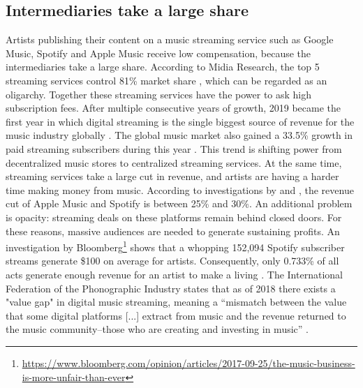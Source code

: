 \subsection{Intermediaries take a large share}
Artists publishing their content on a music streaming service such as Google Music, Spotify and Apple Music receive low compensation, because the intermediaries take a large share. According to Midia Research, the top 5 streaming services control 81\% market share \citep{midiamarketshare2020}, which can be regarded as an oligarchy. Together these streaming services have the power to ask high subscription fees. After multiple consecutive years of growth, 2019 became the first year in which digital streaming is the single biggest source of revenue for the music industry globally \citep{ifpi2020global}. The global music market also gained a 33.5\% growth in paid streaming subscribers during this year \citep{ifpi2020global}. This trend is shifting power from decentralized music stores to centralized streaming services. 
At the same time, streaming services take a large cut in revenue, and artists are having a harder time making money from music. According to investigations by \cite{chris2018dissecting} and \cite{recode2015}, the revenue cut of Apple Music and Spotify is between 25\% and 30\%. An additional problem is opacity: streaming deals on these platforms remain behind closed doors. For these reasons, massive audiences are needed to generate sustaining profits. An investigation by Bloomberg\footnote{\url{https://www.bloomberg.com/opinion/articles/2017-09-25/the-music-business-is-more-unfair-than-ever}} shows that a whopping 152,094 Spotify subscriber streams generate \$100 on average for artists. Consequently, only 0.733\% of all acts generate enough revenue for an artist to make a living \citep{ingham2018odds}. The International Federation of the Phonographic Industry states that as of 2018 there exists a "value gap" in digital music streaming, meaning a ``mismatch between the value that some digital platforms [...] extract from music and the revenue returned to the music community–those who are creating and investing in music'' \citep{ifpi2018global}.

